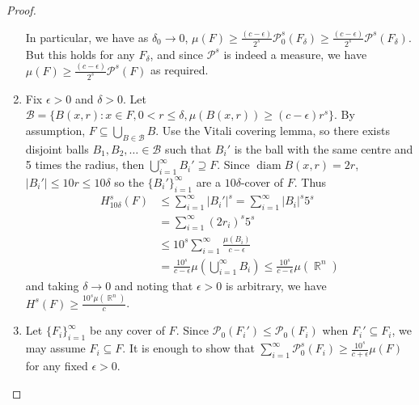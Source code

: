 \documentclass[11pt, a4paper]{memoir}
\DeclareMathOperator{\R}{{\mathbb{R}}}
\theoremstyle{change}
\theoremstyle{plain}
\theoremstyle{nonumberplain}
\newtheorem{proof}{Proof}
\DeclareMathOperator{\diam}{diam}
\numberwithin{equation}{section}
\begin{document}
\begin{proof}
\begin{enumerate}[nl,r]
            In particular, we have as $\delta_0\to 0$, $\mu(F)\geq\frac{(c-\epsilon)}{2^s}\mathcal{P}_0^s(F_\delta)\geq\frac{(c-\epsilon)}{2^s}\mathcal{P}^s(F_\delta)$.
            But this holds for any $F_\delta$, and since $\mathcal{P}^s$ is indeed a measure, we have $\mu(F)\geq\frac{(c-\epsilon)}{2^s}\mathcal{P}^s(F)$ as required.
        \item Fix $\epsilon>0$ and $\delta>0$.
            Let $\mathcal{B}=\{B(x,r):x\in F,0<r\leq\delta,\mu(B(x,r))\geq(c-\epsilon)r^s\}$.
            By assumption, $F\subseteq\bigcup_{B\in\mathcal{B}}B$.
            Use the Vitali covering lemma, so there exists disjoint balls $B_1,B_2,\ldots\in\mathcal{B}$ such that $B_i'$ is the ball with the same centre and 5 times the radius, then $\bigcup_{i=1}^\infty B_i'\supseteq F$.
            Since $\diam B(x,r)=2r$, $|B_i'|\leq 10r\leq 10\delta$ so the $\{B_i'\}_{i=1}^\infty$ are a $10\delta$-cover of $F$.
            Thus
            \begin{align*}
                H_{10\delta}^s(F) &\leq\sum_{i=1}^\infty|B_i'|^s = \sum_{i=1}^\infty|B_i|^s5^s\\
                                  &= \sum_{i=1}^\infty(2r_i)^s5^s\\
                                  &\leq 10^s\sum_{i=1}^\infty\frac{\mu(B_i)}{c-\epsilon}\\
                                  &= \frac{10^s}{c-\epsilon}\mu\left(\bigcup_{i=1}^\infty B_i\right)\leq\frac{10^s}{c-\epsilon}\mu(\R^n)
            \end{align*}
            and taking $\delta\to 0$ and noting that $\epsilon>0$ is arbitrary, we have $H^s(F)\geq\frac{10^s\mu(\R^n)}{c}$.
        \item Let $\{F_i\}_{i=1}^\infty$ be any cover of $F$.
            Since $\mathcal{P}_0(F_i')\leq\mathcal{P}_0(F_i)$ when $F_i'\subseteq F_i$, we may assume $F_i\subseteq F$.
            It is enough to show that $\sum_{i=1}^\infty\mathcal{P}_0^s(F_i)\geq\frac{10^s}{c+\epsilon}\mu(F)$ for any fixed $\epsilon>0$.


\end{enumerate}
\end{proof}
\end{document}
